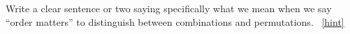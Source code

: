 \documentclass{book}
\begin{document}
\setcounter{project}{118}
\addtocounter{project}{-1}
\begin{activity}[]\label{activity-111}
\hypertarget{p-843}{}%
Write a clear sentence or two saying specifically what we mean when we say ``order matters'' to distinguish between combinations and permutations.%
~\hfill{\tiny\hyperlink{a-118}{[hint]}\hypertarget{q-118}{}}\end{activity}
\end{document}
